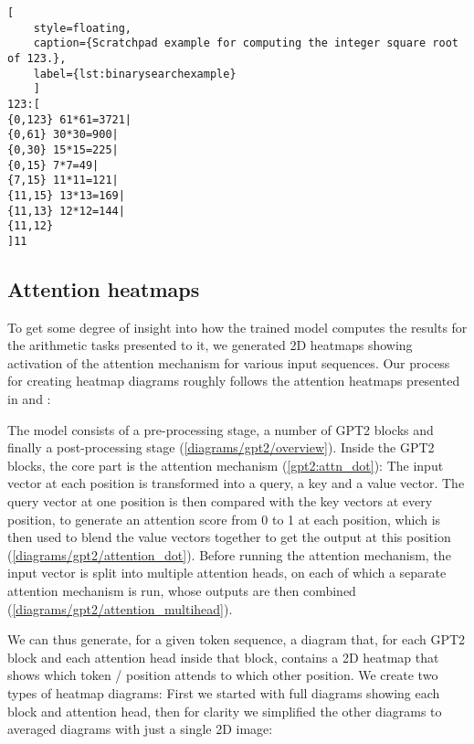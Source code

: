 \begin{lstlisting}[
	style=floating,
	caption={Scratchpad example for computing the integer square root of 123.},
	label={lst:binarysearchexample}
	]
123:[
{0,123} 61*61=3721| 
{0,61} 30*30=900|
{0,30} 15*15=225|
{0,15} 7*7=49|
{7,15} 11*11=121|
{11,15} 13*13=169|
{11,13} 12*12=144|
{11,12}
]11
\end{lstlisting}





\FloatBarrier
\subsection{Attention heatmaps}
\label{methods:heatmap}

To get some degree of insight into how the trained model computes the results for the arithmetic tasks presented to it, we generated 2D heatmaps showing activation of the attention mechanism for various input sequences. Our process for creating heatmap diagrams roughly follows the attention heatmaps presented in \cite{bertsecrets} and \cite{analyzingheads}:

The model consists of a pre-processing stage, a number of GPT2 blocks and finally a post-processing stage (\cref{diagrams/gpt2/overview}). Inside the GPT2 blocks, the core part is the attention mechanism (\cref{gpt2:attn_dot}): The input vector at each position is transformed into a query, a key and a value vector. The query vector at one position is then compared with the key vectors at every position, to generate an attention score from 0 to 1 at each position, which is then used to blend the value vectors together to get the output at this position (\cref{diagrams/gpt2/attention_dot}).
Before running the attention mechanism, the input vector is split into multiple attention heads, on each of which a separate attention mechanism is run, whose outputs are then combined (\cref{diagrams/gpt2/attention_multihead}).

We can thus generate, for a given token sequence, a diagram that, for each GPT2 block and each attention head inside that block, contains a 2D heatmap that shows which token / position attends to which other position.
We create two types of heatmap diagrams: First we started with full diagrams showing each block and attention head, then for clarity we simplified the other diagrams to averaged diagrams with just a single 2D image:

